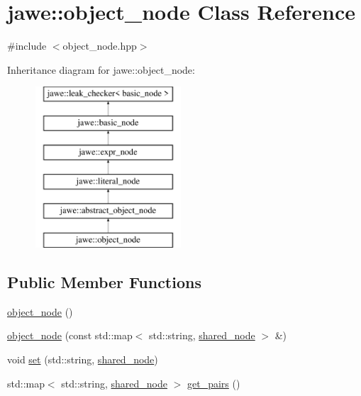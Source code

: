 \hypertarget{classjawe_1_1object__node}{}\section{jawe\+:\+:object\+\_\+node Class Reference}
\label{classjawe_1_1object__node}


{\ttfamily \#include $<$object\+\_\+node.\+hpp$>$}

Inheritance diagram for jawe\+:\+:object\+\_\+node\+:\begin{figure}[H]
\begin{center}
\leavevmode
\includegraphics[height=6.000000cm]{classjawe_1_1object__node}
\end{center}
\end{figure}
\subsection*{Public Member Functions}
\begin{DoxyCompactItemize}
\item 
\hyperlink{classjawe_1_1object__node_ad2341ef1866ed3364fe84d5099695ce6}{object\+\_\+node} ()
\item 
\hyperlink{classjawe_1_1object__node_ada482c770ae9c4c336deab82a0ac129d}{object\+\_\+node} (const std\+::map$<$ std\+::string, \hyperlink{namespacejawe_a3f307481d921b6cbb50cc8511fc2b544}{shared\+\_\+node} $>$ \&)
\item 
void \hyperlink{classjawe_1_1object__node_a0a46b9bedc1c5dcbaa65bcde48b29787}{set} (std\+::string, \hyperlink{namespacejawe_a3f307481d921b6cbb50cc8511fc2b544}{shared\+\_\+node})
\item 
std\+::map$<$ std\+::string, \hyperlink{namespacejawe_a3f307481d921b6cbb50cc8511fc2b544}{shared\+\_\+node} $>$ \hyperlink{classjawe_1_1object__node_ab8b07adcd640a699b3a67f151d9dee19}{get\+\_\+pairs} ()
\end{DoxyCompactItemize}
